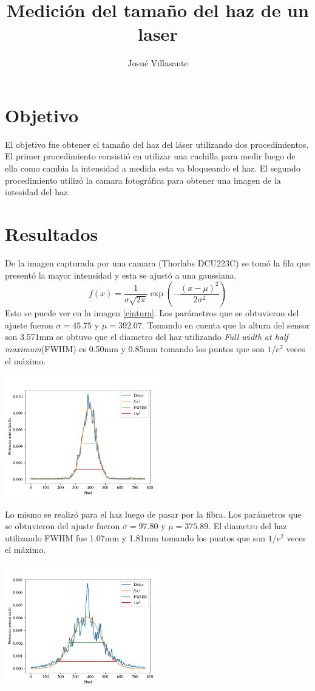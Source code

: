 \documentclass[onecolumn]{article}
\author{Josué Villasante}
\title{Medición del tamaño del haz de un laser}
\begin{document}
	\maketitle

	\section{Objetivo}
		El objetivo fue obtener el tamaño del haz del láser utilizando dos procedimientos. El primer procedimiento consistió en utilizar una cuchilla para medir luego de ella como cambia la intensidad a medida esta va bloqueando el haz. El segundo procedimiento utilizó la camara fotográfica para obtener una imagen de la intesidad del haz.

	\section{Resultados}
		De la imagen capturada por una camara (Thorlabs DCU223C) se tomó la fila que presentó la mayor intensidad y esta se ajustó a una gaussiana. 
		$$
		f(x) = \frac{1}{\sigma\sqrt{2\pi}}\exp({-\frac{(x-\mu)^2}{2\sigma^2}})
		$$
		Esto se puede ver en la imagen \ref{cintura}. Los parámetros que se obtuvieron del ajuste fueron $\sigma=45.75$ y $\mu=392.07$. Tomando en cuenta que la altura del sensor son 3.571mm se obtuvo que el diametro del haz utilizando \textit{Full width at half maximum}(FWHM) es 0.50mm y 0.85mm tomando los puntos que son $1/e^2$ veces el máximo.

		\begin{center}
			\includegraphics[width=200pt]{img/plot-LaserCintura.pdf}
			\label{cintura}
		\end{center}

		Lo mismo se realizó para el haz luego de pasar por la fibra. Los parámetros que se obtuvieron del ajuste fueron $\sigma=97.80$ y $\mu=375.89$. El diametro del haz utilizando FWHM fue 1.07mm y 1.81mm tomando los puntos que son $1/e^2$ veces el máximo.

		\begin{center}
			\includegraphics[width=200pt]{img/plot-FibraCintura.pdf}
			\label{cintura}
		\end{center}
\end{document}
